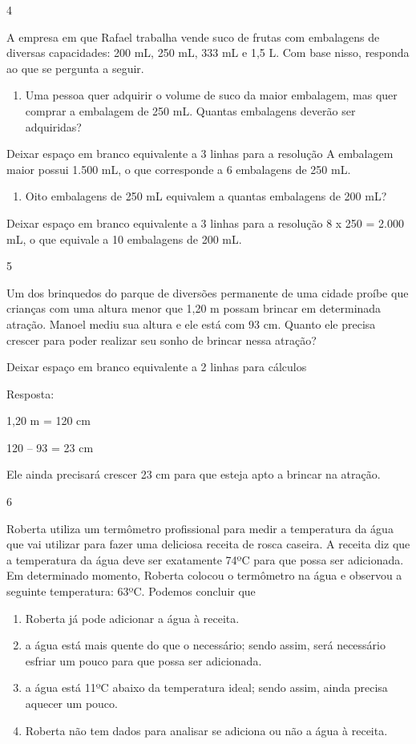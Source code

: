 \begin{mdframed}[linewidth=2pt,linecolor=salmao,roundcorner=2pt]
\begin{itemize}
{\begin{itemize}
\begin{escolha}
\num{4}

A empresa em que Rafael trabalha vende suco de frutas com embalagens de
diversas capacidades: 200 mL, 250 mL, 333 mL e 1,5 L. Com base nisso, responda ao que se pergunta a seguir.

\begin{enumerate}
\item
  Uma pessoa quer adquirir o volume de suco da maior embalagem,
  mas quer comprar a embalagem de 250 mL. Quantas embalagens deverão ser adquiridas?
\end{enumerate}

Deixar espaço em branco equivalente a 3 linhas para a resolução
A embalagem maior possui 1.500 mL, o que corresponde a 6 embalagens de 250 mL.

\begin{enumerate}
\item
  Oito embalagens de 250 mL equivalem a quantas embalagens de 200 mL?
\end{enumerate}

Deixar espaço em branco equivalente a 3 linhas para a resolução
8 x 250 = 2.000 mL, o que equivale a 10 embalagens de 200 mL.


\num{5}

Um dos brinquedos do parque de diversões permanente de uma cidade proíbe
que crianças com uma altura menor que 1,20 m possam brincar em determinada
atração. Manoel mediu sua altura e ele está com 93 cm. Quanto ele
precisa crescer para poder realizar seu sonho de brincar nessa atração?

Deixar espaço em branco equivalente a 2 linhas para cálculos

Resposta:

1,20 m = 120 cm

120 -- 93 = 23 cm

Ele ainda precisará crescer 23 cm para que esteja apto a brincar na atração.

\num{6}

Roberta utiliza um termômetro profissional para medir a temperatura da
água que vai utilizar para fazer uma deliciosa receita de rosca
caseira. A receita diz que a temperatura da água deve ser exatamente 74ºC
para que possa ser adicionada. Em determinado momento, Roberta colocou
o termômetro na água e observou a seguinte temperatura: 63ºC. Podemos concluir que

\begin{enumerate}
\item
  Roberta já pode adicionar a água à receita.
\item
  a água está mais quente do que o necessário; sendo assim, será
  necessário esfriar um pouco para que possa ser adicionada.
\item
  a água está 11ºC abaixo da temperatura ideal; sendo assim, ainda
  precisa aquecer um pouco.
\item
  Roberta não tem dados para analisar se adiciona ou não a água à receita.
\end{enumerate}


\end{escolha}
\end{itemize}}
\end{itemize}
\end{mdframed}
